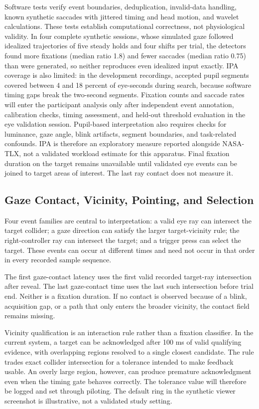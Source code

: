 Software tests verify event boundaries, deduplication, invalid-data handling, known synthetic saccades with jittered timing and head motion, and wavelet calculations. These tests establish computational correctness, not physiological validity. In four complete synthetic sessions, whose simulated gaze followed idealized trajectories of five steady holds and four shifts per trial, the detectors found more fixations (median ratio 1.8) and fewer saccades (median ratio 0.75) than were generated, so neither reproduces even idealized input exactly. IPA coverage is also limited: in the development recordings, accepted pupil segments covered between 4 and 18 percent of eye-seconds during search, because software timing gaps break the two-second segments. Fixation counts and saccade rates will enter the participant analysis only after independent event annotation, calibration checks, timing assessment, and held-out threshold evaluation in the eye validation session. Pupil-based interpretation also requires checks for luminance, gaze angle, blink artifacts, segment boundaries, and task-related confounds. IPA is therefore an exploratory measure reported alongside NASA-TLX, not a validated workload estimate for this apparatus. Final fixation duration on the target remains unavailable until validated eye events can be joined to target areas of interest. The last ray contact does not measure it.

\subsection{Gaze Contact, Vicinity, Pointing, and Selection}
Four event families are central to interpretation: a valid eye ray can intersect the target collider; a gaze direction can satisfy the larger target-vicinity rule; the right-controller ray can intersect the target; and a trigger press can select the target. These events can occur at different times and need not occur in that order in every recorded sample sequence.

The first gaze-contact latency uses the first valid recorded target-ray intersection after reveal. The last gaze-contact time uses the last such intersection before trial end. Neither is a fixation duration. If no contact is observed because of a blink, acquisition gap, or a path that only enters the broader vicinity, the contact field remains missing.

Vicinity qualification is an interaction rule rather than a fixation classifier. In the current system, a target can be acknowledged after 100 ms of valid qualifying evidence, with overlapping regions resolved to a single closest candidate. The rule trades exact collider intersection for a tolerance intended to make feedback usable. An overly large region, however, can produce premature acknowledgment even when the timing gate behaves correctly. The tolerance value will therefore be logged and set through piloting. The default ring in the synthetic viewer screenshot is illustrative, not a validated study setting.

